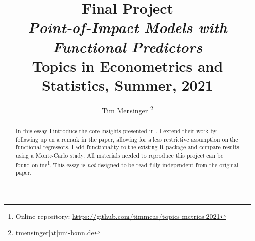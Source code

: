 \documentclass[a4paper, 12pt]{article}
\title{\textbf{Final Project}\\
    \large \textit{Point-of-Impact Models with Functional Predictors}\\[1em]
    \Large Topics in Econometrics and Statistics, Summer, 2021
}
\date{}
\author{Tim Mensinger%
  \thanks{\href{mailto:tmensinger@uni-bonn.de}{tmensinger[at]uni-bonn.de}}}
\affil{University of Bonn}
\begin{document}
\onehalfspacing


\maketitle
\begin{abstract}
    In this essay I introduce the core insights presented in \cite{Kneip2020}. I extend
    their work by following up on a remark in the paper, allowing for a less restrictive
    assumption on the functional regressors. I add functionality to the existing
    \textsf{R}-package and compare results using a Monte-Carlo study. All materials
    needed to reproduce this project can be found online\footnote{Online repository:
    \url{https://github.com/timmens/topics-metrics-2021}}. This essay is \emph{not}
    designed to be read fully independent from the original paper.
\end{abstract}
\thispagestyle{empty}

\newpage






\printbibliography
\end{document}
